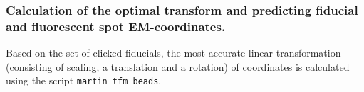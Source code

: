 \documentclass[10pt,a4paper,onepage,DIV12]{scrartcl}
\begin{document}
% 
% 
% 
% 
% 

\newpage
\subsubsection{Calculation of the optimal transform and predicting fiducial and fluorescent spot EM-coordinates.}
Based on the set of clicked fiducials, the most accurate linear transformation (consisting of scaling, a translation and a rotation) of coordinates is calculated using the script \texttt{martin\_tfm\_beads}.
% 
\end{document}
